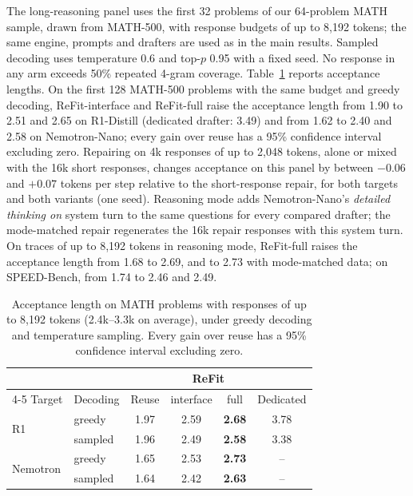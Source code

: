 \documentclass[11pt]{article}
\newcommand{\refit}{ReFit}
\newcommand{\refitI}{ReFit-interface}
\newcommand{\refitF}{ReFit-full}
\begin{document}
The long-reasoning panel uses the first 32 problems of our 64-problem MATH sample, drawn from MATH-500, with response budgets of up to 8,192 tokens; the same engine, prompts and drafters are used as in the main results.
Sampled decoding uses temperature 0.6 and top-$p$ 0.95 with a fixed seed.
No response in any arm exceeds 50\% repeated 4-gram coverage.
Table~\ref{tab:long} reports acceptance lengths.
On the first 128 MATH-500 problems with the same budget and greedy decoding, \refitI{} and \refitF{} raise the acceptance length from 1.90 to 2.51 and 2.65 on R1-Distill (dedicated drafter: 3.49) and from 1.62 to 2.40 and 2.58 on Nemotron-Nano; every gain over reuse has a 95\% confidence interval excluding zero.
Repairing on 4k responses of up to 2,048 tokens, alone or mixed with the 16k short responses, changes acceptance on this panel by between $-0.06$ and $+0.07$ tokens per step relative to the short-response repair, for both targets and both variants (one seed).
Reasoning mode adds Nemotron-Nano's \emph{detailed thinking on} system turn to the same questions for every compared drafter; the mode-matched repair regenerates the 16k repair responses with this system turn.
On traces of up to 8,192 tokens in reasoning mode, \refitF{} raises the acceptance length from 1.68 to 2.69, and to 2.73 with mode-matched data; on SPEED-Bench, from 1.74 to 2.46 and 2.49.

\begin{table}[h]
  \centering
  \small
  \setlength{\tabcolsep}{4pt}
  \begin{tabular}{@{}llcccc@{}}
    \toprule
    & & & \multicolumn{2}{c}{\refit{}} & \\
    \cmidrule(lr){4-5}
    Target & Decoding & Reuse & interface & full & Dedicated \\
    \midrule
    \multirow{2}{*}{R1} & greedy & 1.97 & 2.59 & \textbf{2.68} & 3.78 \\
                        & sampled & 1.96 & 2.49 & \textbf{2.58} & 3.38 \\
    \multirow{2}{*}{Nemotron} & greedy & 1.65 & 2.53 & \textbf{2.73} & -- \\
                              & sampled & 1.64 & 2.42 & \textbf{2.63} & -- \\
    \bottomrule
  \end{tabular}
  \caption{Acceptance length on MATH problems with responses of up to 8,192 tokens (2.4k--3.3k on average), under greedy decoding and temperature sampling. Every gain over reuse has a 95\% confidence interval excluding zero.}
  \label{tab:long}
\end{table}
\end{document}
